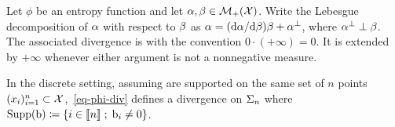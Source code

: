 \begin{defn}
\label{def_divergence}
Let $\phi$ be an entropy function and let $\alpha,\beta\in\mathcal{M}_+(\mathcal{X})$. Write the Lebesgue decomposition of $\alpha$ with respect to $\beta$ as
$\alpha=(\mathrm{d}\alpha/\mathrm{d}\beta)\beta+\alpha^\perp$, where $\alpha^\perp\perp\beta$. The associated divergence is
with the convention $0\cdot(+\infty)=0$. It is extended by $+\infty$ whenever either argument is not a nonnegative measure.
\end{defn}
In the discrete setting, assuming
are supported on the same set of $n$ points $(x_i)_{i=1}^n \subset \mathcal{X}$,~\eqref{eq-phi-div} defines a divergence on $\Sigma_n$
where $\operatorname{Supp}(\mathrm{b}) \coloneqq \left\{ i \in \llbracket n\rrbracket \;;\;  \mathrm{b}_i \neq 0  \right\}$.

